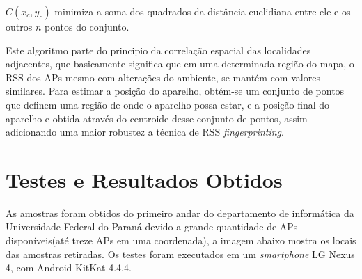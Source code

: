   $C(x_c,y_c)$ minimiza a soma dos quadrados da distância euclidiana entre ele e os outros $n$ pontos do conjunto\cite{centroid}.
  
      Este algoritmo parte do principio da correlação espacial das localidades adjacentes\cite{fingerPrint2}, 
  que basicamente significa que em uma determinada região do mapa, o RSS dos APs
  mesmo com alterações do ambiente, se mantém com valores similares. Para estimar a posição do aparelho, 
  obtém-se um conjunto de pontos que definem uma região de onde o aparelho possa estar, e a posição final do aparelho 
  e obtida através do centroide desse conjunto de pontos, assim adicionando uma maior robustez 
  a técnica de RSS \textit{fingerprinting}.
  
  \section{Testes e Resultados Obtidos}
  
  As amostras foram obtidos do primeiro andar do departamento de informática da Universidade Federal do Paraná devido a 
  grande quantidade de APs disponíveis(até treze APs em uma coordenada), a imagem abaixo mostra os locais das amostras retiradas.
  Os testes foram executados em um \textit{smartphone} LG Nexus 4, com Android KitKat 4.4.4.
  
